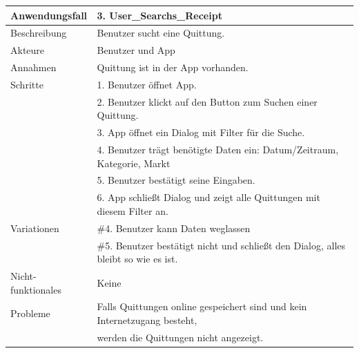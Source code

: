 \begin{enumerate}[(a)]
\begin{enumerate}[1.]
         \begin{tabular}{l|l}
            Anwendungsfall & 3. User\_Searchs\_Receipt \\ 
            \hline  
            Beschreibung & Benutzer sucht eine Quittung. \\
            \hline  
            Akteure & Benutzer und App \\
            \hline  
            Annahmen & Quittung ist in der App vorhanden. \\
            \hline  
            Schritte & 1. Benutzer öffnet App. \\
            & 2. Benutzer klickt auf den Button zum Suchen einer Quittung. \\
            & 3. App öffnet ein Dialog mit Filter für die Suche. \\
            & 4. Benutzer trägt benötigte Daten ein: Datum/Zeitraum, Kategorie, Markt \\
            & 5. Benutzer bestätigt seine Eingaben. \\
            & 6. App schließt Dialog und zeigt alle Quittungen mit diesem Filter an. \\
            \hline  
            Variationen & \#4. Benutzer kann Daten weglassen \\
            & \#5. Benutzer bestätigt nicht und schließt den Dialog, alles bleibt so wie es ist. \\
            \hline  
            Nicht-funktionales & Keine \\
            \hline  
            Probleme & Falls Quittungen online gespeichert sind und kein Internetzugang besteht, \\ 
            & werden die Quittungen nicht angezeigt. \\
            \hline  
 
        \end{tabular}
        
        
        

\end{enumerate}
\end{enumerate}
